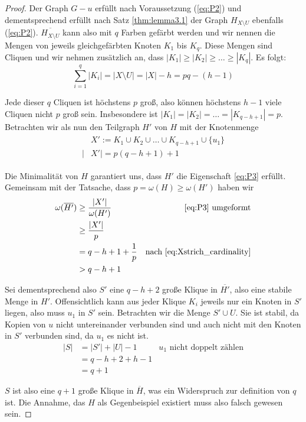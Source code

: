 \documentclass[../main.tex]{subfiles}
\begin{document}
\begin{proof}
    Der Graph $G - u$ erfüllt nach Voraussetzung (\ref{eq:P2}) und dementsprechend erfüllt nach Satz \ref{thm:lemma3.1} der Graph $H_{X\setminus U}$ ebenfalls (\ref{eq:P2}). $\overline{H_{X\setminus U}}$ kann also mit $q$ Farben gefärbt werden und wir nennen die Mengen von jeweils gleichgefärbten Knoten $K_1$ bis $K_q$. Diese Mengen sind Cliquen und wir nehmen zusätzlich an, dass $|K_1| \geq |K_2| \geq \hdots \geq |K_q|$. Es folgt:
    \begin{equation*}
        \sum\limits_{i = 1}^{q} |K_i| = |X \setminus U| = |X| - h = pq - (h-1)
    \end{equation*}
    
    Jede dieser $q$ Cliquen ist höchstens $p$ groß, also können höchstens $h-1$ viele Cliquen nicht $p$ groß sein. Insbesondere ist $|K_1| = |K_2| = \hdots = |K_{q-h+1}| = p$. Betrachten wir als nun den Teilgraph $H'$ von $H$ mit der Knotenmenge
    \begin{align}\label{eq:Xstrich_cardinality}   
        \begin{split}
            &X' := K_1 \cup K_2 \cup \hdots \cup K_{q-h+1} \cup \{u_1\} \\
            |&X'| = p(q-h+1) + 1
        \end{split}
    \end{align}
        
    Die Minimalität von $H$ garantiert uns, dass $H'$ die Eigenschaft \eqref{eq:P3} erfüllt. Gemeinsam mit der Tatsache, dass $p = \omega(H) \geq \omega(H')$ haben wir
    \begin{align*}
        \omega(\overline{H'}) &\geq \frac{|X'|}{\omega(H')} &\text{\eqref{eq:P3} umgeformt} \\
        &\geq \frac{|X'|}{p} \\
        &= q-h+1 + \frac{1}{p} &\text{nach \eqref{eq:Xstrich_cardinality}} \\
        &> q - h + 1
    \end{align*}

    Sei dementsprechend also $S'$ eine $q-h+2$ große Klique in $\overline{H'}$, also eine stabile Menge in $H'$. Offensichtlich kann aus jeder Klique $K_i$ jeweils nur ein Knoten in $S'$ liegen, also muss $u_1$ in $S'$ sein. Betrachten wir die Menge $S' \cup U$. Sie ist stabil, da Kopien von $u$ nicht untereinander verbunden sind und auch nicht mit den Knoten in $S'$ verbunden sind, da $u_1$ es nicht ist.
    \begin{align*}
        |S| &= |S'| + |U| - 1 &u_1\text{ nicht doppelt zählen} \\
        &= q - h + 2 + h - 1 \\
        &= q + 1
    \end{align*}
    
    $S$ ist also eine $q+1$ große Klique in $\overline{H}$, was ein Widerspruch zur definition von $q$ ist. Die Annahme, das $H$ als Gegenbeispiel existiert muss also falsch gewesen sein.
\end{proof}
\end{document}
